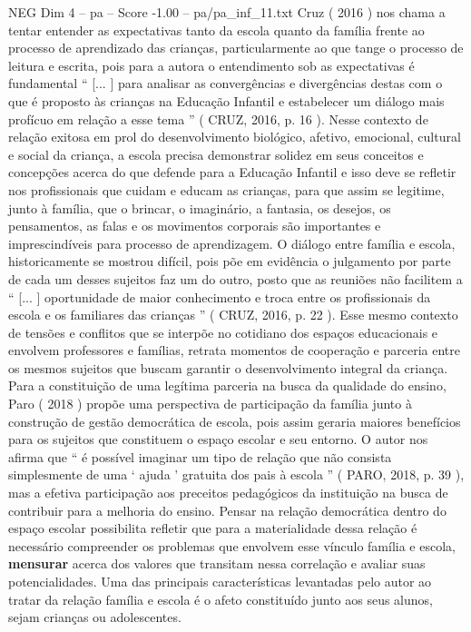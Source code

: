 \begin{textsample}{NEG Dim 4 – pa – Score -1.00 – pa/pa\_inf\_11.txt}
Cruz ( 2016 ) nos chama a tentar entender as expectativas tanto da escola quanto da família frente ao processo de aprendizado das crianças, particularmente ao que tange o processo de leitura e escrita, pois para a autora o entendimento sob as expectativas é fundamental “ [... ] para analisar as convergências e divergências destas com o que é proposto às crianças na Educação Infantil e estabelecer um diálogo mais profícuo em relação a esse tema ” ( CRUZ, 2016, p. 16 ).
Nesse contexto de relação exitosa em prol do desenvolvimento biológico, afetivo, emocional, cultural e social da criança, a escola precisa demonstrar solidez em seus conceitos e concepções acerca do que defende para a Educação Infantil e isso deve se refletir nos profissionais que cuidam e educam as crianças, para que assim se legitime, junto à família, que o brincar, o imaginário, a fantasia, os desejos, os pensamentos, as falas e os movimentos corporais são importantes e imprescindíveis para processo de aprendizagem.
O diálogo entre família e escola, historicamente se mostrou difícil, pois põe em evidência o julgamento por parte de cada um desses sujeitos faz um do outro, posto que as reuniões não facilitem a “ [... ] oportunidade de maior conhecimento e troca entre os profissionais da escola e os familiares das crianças ” ( CRUZ, 2016, p. 22 ).
Esse mesmo contexto de tensões e conflitos que se interpõe no cotidiano dos espaços educacionais e envolvem professores e famílias, retrata momentos de cooperação e parceria entre os mesmos sujeitos que buscam garantir o desenvolvimento integral da criança.
Para a constituição de uma legítima parceria na busca da qualidade do ensino, Paro ( 2018 ) propõe uma perspectiva de participação da família junto à construção de gestão democrática de escola, pois assim geraria maiores benefícios para os sujeitos que constituem o espaço escolar e seu entorno.
O autor nos afirma que “ é possível imaginar um tipo de relação que não consista simplesmente de uma ‘ ajuda ’ gratuita dos pais à escola ” ( PARO, 2018, p. 39 ), mas a efetiva participação aos preceitos pedagógicos da instituição na busca de contribuir para a melhoria do ensino.
Pensar na relação democrática dentro do espaço escolar possibilita refletir que para a materialidade dessa relação é necessário compreender os problemas que envolvem esse vínculo família e escola, \textbf{mensurar} acerca dos valores que transitam nessa correlação e avaliar suas potencialidades.
Uma das principais características levantadas pelo autor ao tratar da relação família e escola é o afeto constituído junto aos seus alunos, sejam crianças ou adolescentes.

\end{textsample}
